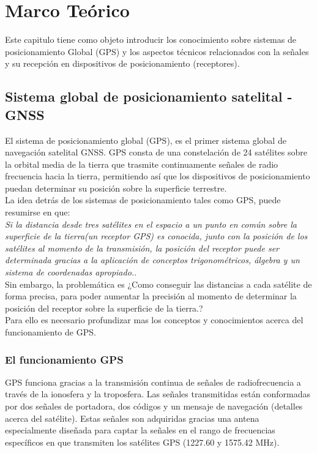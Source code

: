 \chapter{Marco Teórico} 
\label{sec:marcoteorico}

Este capitulo tiene como objeto introducir los conocimiento sobre sistemas de posicionamiento Global (GPS) y los aspectos técnicos relacionados con la señales y su recepción en dispositivos de posicionamiento (receptores).

\section{Sistema global de posicionamiento satelital - GNSS}

El sistema de posicionamiento global (GPS), es el primer sistema global de navegación satelital GNSS. GPS consta de una constelación de 24 satélites sobre la orbital media de la tierra que trasmite continuamente señales de radio frecuencia hacia la tierra, permitiendo así que los dispositivos de posicionamiento puedan determinar su posición sobre la superficie terrestre.\\

La idea detrás de los sistemas de posicionamiento tales como GPS, puede resumirse en que:\\

\textit{Si la distancia desde tres satélites en el espacio a un punto en común sobre la superficie de la tierra(un receptor GPS) es conocida, junto con la posición de los satélites al momento de la transmisión, la posición del receptor puede ser determinada gracias a la aplicación de conceptos trigonométricos, álgebra y un sistema de coordenadas apropiado.\cite{Thompson_1998}.}\\

Sin embargo, la problemática es ¿Como conseguir las distancias a cada satélite de forma precisa, para poder aumentar la precisión al momento de determinar la posición del receptor sobre la superficie de la tierra.?\\

Para ello es necesario profundizar mas los conceptos y conocimientos acerca del funcionamiento de GPS.

\subsection{El funcionamiento GPS}

GPS funciona gracias a la transmisión continua de señales de radiofrecuencia a través de la ionosfera y la troposfera. Las señales transmitidas están conformadas por dos señales de portadora, dos códigos y un mensaje de navegación (detalles acerca del satélite). Estas señales son adquiridas gracias una antena especialmente diseñada para captar la señales en el rango de frecuencias específicos en que transmiten los satélites GPS (1227.60 y 1575.42 MHz).\\

